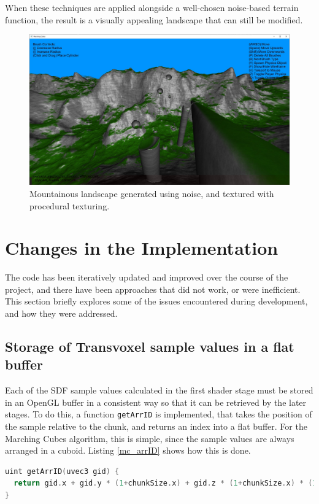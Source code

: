 \documentclass{article}
\begin{document}
When these techniques are applied alongside a well-chosen noise-based terrain function, the result is a visually appealing landscape that can still be modified.
\begin{figure}[H]
  \includegraphics[width=\textwidth]{shaded_mountains.jpg}
  \caption{Mountainous landscape generated using noise, and textured with procedural texturing. }
  \label{fig:shaded_mountains}
\end{figure}


\section{Changes in the Implementation}
The code has been iteratively updated and improved over the course of the project, and there have been approaches that did not work, or were inefficient. This section briefly explores some of the issues encountered during development, and how they were addressed.

\subsection{Storage of Transvoxel sample values in a flat buffer}
Each of the SDF sample values calculated in the first shader stage must be stored in an OpenGL buffer in a consistent way so that it can be retrieved by the later stages. To do this, a function \texttt{getArrID} is implemented, that takes the position of the sample relative to the chunk, and returns an index into a flat buffer. For the Marching Cubes algorithm, this is simple, since the sample values are always arranged in a cuboid. Listing \ref{mc_arrID} shows how this is done.
\begin{lstlisting}[language=C++,label={mc_arrID},caption={Function mapping grid position \texttt{gid} to flat array id}]
uint getArrID(uvec3 gid) {
  return gid.x + gid.y * (1+chunkSize.x) + gid.z * (1+chunkSize.x) * (1+chunkSize.y);
}
\end{lstlisting}
\end{document}
